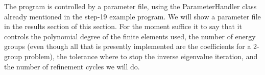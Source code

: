 \documentclass{article}
\begin{document}
The program is controlled by a parameter file, using the ParameterHandler
class already mentioned in the step-19 example program. We will show a
parameter file in the results section of this section. For the moment suffice
it to say that it controls the polynomial degree of the finite elements used,
the number of energy groups (even though all that is presently implemented are
the coefficients for a 2-group problem), the tolerance where to stop the
inverse eigenvalue iteration, and the number of refinement cycles we will do.
\end{document}
